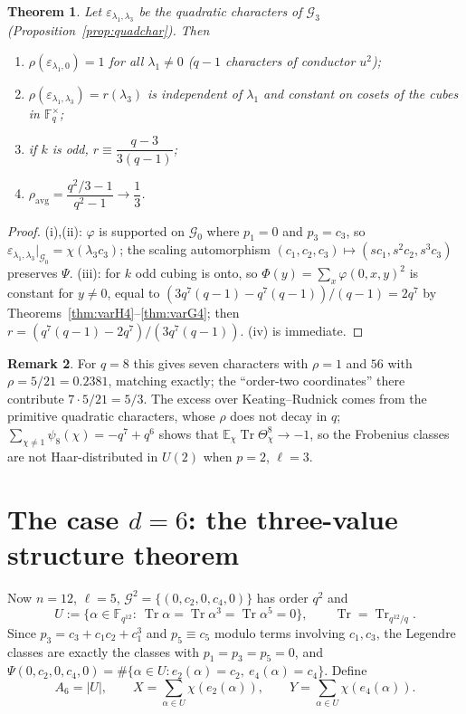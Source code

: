 \documentclass[11pt,a4paper]{amsart}
\newtheorem{theorem}{Theorem}[section]
\theoremstyle{definition}
\newtheorem{remark}[theorem]{Remark}
\newcommand{\F}{\mathbb{F}}
\newcommand{\G}{\mathcal{G}}
\newcommand{\Tr}{\operatorname{Tr}}
\newcommand{\eps}{\varepsilon}
\begin{document}
\begin{theorem}\label{thm:rho4}
Let $\eps_{\lambda_1,\lambda_3}$ be the quadratic characters of $\G_3$ (Proposition~\ref{prop:quadchar}). Then
\begin{enumerate}[label=\textup{(\roman*)},leftmargin=2em]
\item $\rho(\eps_{\lambda_1,0})=1$ for all $\lambda_1\ne0$ ($q-1$ characters of conductor $u^2$);
\item $\rho(\eps_{\lambda_1,\lambda_3})=r(\lambda_3)$ is independent of $\lambda_1$ and constant on cosets of the cubes in $\F_q^\times$;
\item if $k$ is odd, $r\equiv\dfrac{q-3}{3(q-1)}$;
\item $\rho_{\mathrm{avg}}=\dfrac{q^2/3-1}{q^2-1}\to\dfrac13$.
\end{enumerate}
\end{theorem}
\begin{proof}
(i),(ii): $\varphi$ is supported on $\G_0$ where $p_1=0$ and $p_3=c_3$, so $\eps_{\lambda_1,\lambda_3}|_{\G_0}=\chi(\lambda_3c_3)$; the scaling automorphism $(c_1,c_2,c_3)\mapsto(sc_1,s^2c_2,s^3c_3)$ preserves $\Psi$. (iii): for $k$ odd cubing is onto, so $\Phi(y)=\sum_x\varphi(0,x,y)^2$ is constant for $y\ne0$, equal to $(3q^7(q-1)-q^7(q-1))/(q-1)=2q^7$ by Theorems~\ref{thm:varH4}--\ref{thm:varG4}; then $r=(q^7(q-1)-2q^7)/(3q^7(q-1))$. (iv) is immediate.
\end{proof}

\begin{remark}
For $q=8$ this gives seven characters with $\rho=1$ and $56$ with $\rho=5/21=0.2381$, matching \cite[Table~4]{Chen} exactly; the ``order-two coordinates'' there contribute $7\cdot5/21=5/3$. The excess over Keating--Rudnick comes from the primitive quadratic characters, whose $\rho$ does not decay in $q$; $\sum_{\chi\ne1}\psi_8(\chi)=-q^7+q^6$ shows that $\mathbb E_\chi\Tr\Theta_\chi^8\to-1$, so the Frobenius classes are not Haar-distributed in $U(2)$ when $p=2$, $\ell=3$.
\end{remark}

\section{The case \texorpdfstring{$d=6$}{d=6}: the three-value structure theorem}\label{sec:d6}

Now $n=12$, $\ell=5$, $\G^2=\{(0,c_2,0,c_4,0)\}$ has order $q^2$ and
\[
U:=\{\alpha\in\F_{q^{12}}:\ \Tr\alpha=\Tr\alpha^3=\Tr\alpha^5=0\},\qquad \Tr=\Tr_{q^{12}/q}.
\]
Since $p_3=c_3+c_1c_2+c_1^3$ and $p_5\equiv c_5$ modulo terms involving $c_1,c_3$, the Legendre classes are exactly the classes with $p_1=p_3=p_5=0$, and $\Psi(0,c_2,0,c_4,0)=\#\{\alpha\in U:e_2(\alpha)=c_2,\ e_4(\alpha)=c_4\}$. Define
\[
A_6=|U|,\qquad X=\sum_{\alpha\in U}\chi(e_2(\alpha)),\qquad Y=\sum_{\alpha\in U}\chi(e_4(\alpha)).
\]
\end{document}
